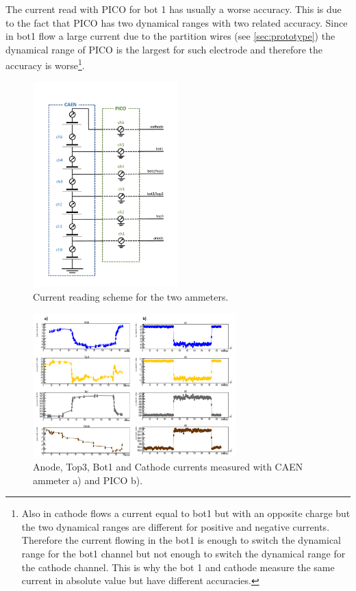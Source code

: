 \documentclass[a4paper, 11 pt]{report}
\begin{document}
The current read with PICO for bot 1 has usually a worse accuracy. This is due to the fact that 
PICO has two dynamical ranges with two related accuracy. Since in bot1 flow a large current due to 
the partition wires (see \ref{sec:prototype}) the dynamical range of PICO is the largest for such 
electrode and therefore the accuracy is worse\footnote{Also in cathode flows a current equal to 
bot1 but with an opposite charge but the two dynamical ranges are different for positive and 
negative currents. Therefore the current flowing in the bot1 is enough to switch the dynamical 
range for the bot1 channel but not enough to switch the dynamical range for the cathode channel.
This is why the bot 1 and cathode measure the same current in absolute value but have different
accuracies.}.
\begin{figure}
	\centering
	\includegraphics[width=0.5\textwidth]{Immagini/schema_canali_2.pdf}
	\caption{Current reading scheme for the two ammeters.}
	\label{fig:schema_canali}
\end{figure}
\begin{figure}
	\centering
	\includegraphics[width=0.7\textwidth]{Immagini/run190_CAEN_pico.pdf}
	\caption{Anode, Top3, Bot1 and Cathode currents measured with CAEN ammeter a) and PICO b).}
	\label{fig:run190_CAEN_pico}
\end{figure}
\end{document}
